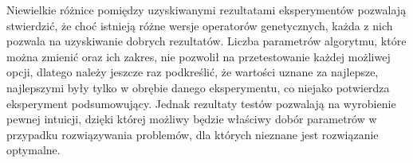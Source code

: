 Niewielkie różnice pomiędzy uzyskiwanymi rezultatami eksperymentów pozwalają stwierdzić, że choć istnieją różne wersje operatorów genetycznych, każda z nich pozwala na uzyskiwanie dobrych rezultatów. Liczba parametrów algorytmu, które można zmienić oraz ich zakres, nie pozwolił na przetestowanie każdej możliwej opcji, dlatego należy jeszcze raz podkreślić, że wartości uznane za najlepsze, najlepszymi były tylko w obrębie danego eksperymentu, co niejako potwierdza eksperyment podsumowujący. Jednak rezultaty testów pozwalają na wyrobienie pewnej intuicji, dzięki której możliwy będzie właściwy dobór parametrów w przypadku rozwiązywania problemów, dla których nieznane jest rozwiązanie optymalne.  